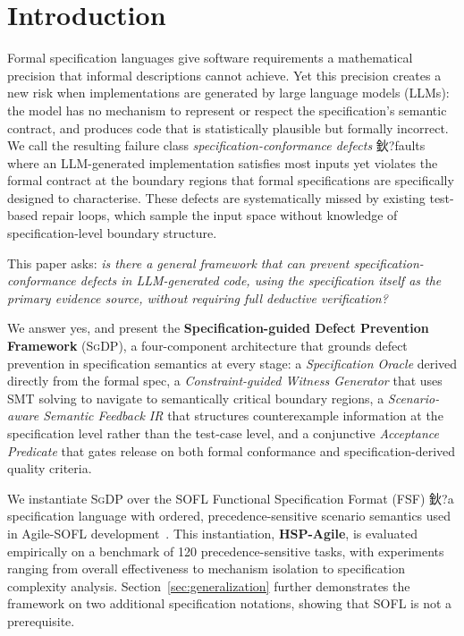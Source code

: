 ﻿\section{Introduction}
\label{sec:intro}

Formal specification languages give software requirements a mathematical precision that
informal descriptions cannot achieve.  Yet this precision creates a new risk when
implementations are generated by large language models (LLMs): the model has no mechanism
to represent or respect the specification's semantic contract, and produces code that is
statistically plausible but formally incorrect.  We call the resulting failure class
\emph{specification-conformance defects} 鈥?faults where an LLM-generated implementation
satisfies most inputs yet violates the formal contract at the boundary regions that
formal specifications are specifically designed to characterise.  These defects are
systematically missed by existing test-based repair loops, which sample the input space
without knowledge of specification-level boundary structure.

This paper asks: \emph{is there a general framework that can prevent
specification-conformance defects in LLM-generated code, using the specification itself
as the primary evidence source, without requiring full deductive verification?}

We answer yes, and present the \textbf{Specification-guided Defect Prevention Framework}
(\textsc{SgDP}), a four-component architecture that grounds defect prevention in
specification semantics at every stage: a \emph{Specification Oracle} derived directly
from the formal spec, a \emph{Constraint-guided Witness Generator} that uses SMT solving
to navigate to semantically critical boundary regions, a \emph{Scenario-aware Semantic
Feedback IR} that structures counterexample information at the specification level rather
than the test-case level, and a conjunctive \emph{Acceptance Predicate} that gates release
on both formal conformance and specification-derived quality criteria.

We instantiate \textsc{SgDP} over the SOFL Functional Specification Format (FSF) 鈥?a specification language with ordered, precedence-sensitive scenario semantics used in
Agile-SOFL development~\cite{liu1998sofl,liu2004soflbook,li2022qrs_companion}.
This instantiation, \textbf{HSP-Agile}, is evaluated
empirically on a benchmark of 120 precedence-sensitive tasks, with experiments ranging
from overall effectiveness to mechanism isolation to specification complexity analysis.
Section~\ref{sec:generalization} further demonstrates the framework on two additional
specification notations, showing that SOFL is not a prerequisite.


